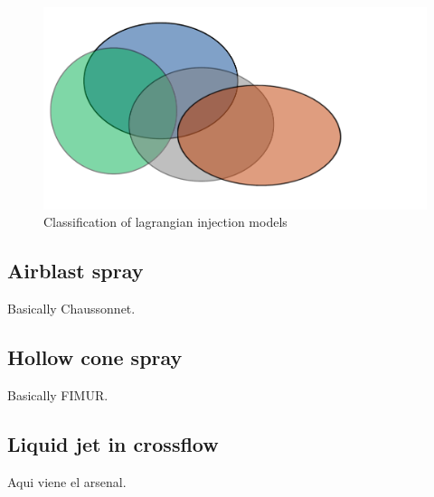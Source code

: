 \begin{figure}[h!]
	\centering
	\includegraphics[scale=0.5]{./part1_numerical_approaches/figures_ch3/state_art_lagrangian}
	\caption{Classification of lagrangian injection models}
	\label{fig:state_art_injection}
\end{figure}

\subsection{Airblast spray}

Basically Chaussonnet.

\subsection{Hollow cone spray}

Basically FIMUR.

\subsection{Liquid jet in crossflow}

Aqui viene el arsenal.